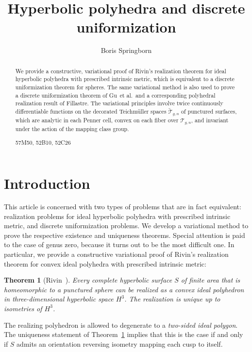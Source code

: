 \documentclass[a4paper, 11pt]{article}
\title{Hyperbolic polyhedra and discrete uniformization}
\author{Boris Springborn}
\date{}
\newcommand{\Teich}{\mathcal{T}}
\newcommand{\decTeich}{\widetilde{\Teich}}
\newcommand{\Tm}{Teich\-m{\"u}l\-ler}
\newcommand{\etal}{{et al.}}
\theoremstyle{plain}
\newtheorem{theorem}{Theorem}[section]
\theoremstyle{definition}
\begin{document}
\maketitle

\begin{abstract}
  We provide a constructive, variational proof of Rivin's realization
  theorem for ideal hyperbolic polyhedra with prescribed intrinsic
  metric, which is equivalent to a discrete uniformization theorem for
  spheres. The same variational method is also used to prove a
  discrete uniformization theorem of Gu~\etal\ and a corresponding
  polyhedral realization result of Fillastre. The variational
  principles involve twice continuously differentiable functions on
  the decorated \Tm{} spaces $\decTeich_{g,n}$ of punctured surfaces,
  which are analytic in each Penner cell, convex on each fiber over
  $\Teich_{g,n}$, and invariant under the action of the mapping class
  group.
  
  \vspace{\baselineskip}\noindent%
  57M50, 52B10, 52C26
\end{abstract}


\section{Introduction}

This article is concerned with two types of problems that are in fact
equivalent: realization problems for ideal hyperbolic polyhedra with
prescribed intrinsic metric, and discrete uniformization problems. We
develop a variational method to prove the respective existence and
uniqueness theorems. Special attention is paid to the case of genus
zero, because it turns out to be the most difficult one. 
In particular, we provide a constructive variational proof of Rivin's
realization theorem for convex ideal polyhedra with prescribed
intrinsic metric:

\begin{theorem}[Rivin~\cite{rivin94:_intrin}]
  \label{thm:rivin}
  Every complete hyperbolic surface $S$ of finite area that is
  homeomorphic to a punctured sphere can be realized as a convex ideal
  polyhedron in three-dimensional hyperbolic space $H^{3}$. The
  realization is unique up to isometries of $H^{3}$.
\end{theorem}

The realizing polyhedron is allowed to degenerate to a \emph{two-sided
  ideal polygon}. The uniqueness statement of Theorem~\ref{thm:rivin}
implies that this is the case if and only if $S$ admits an orientation
reversing isometry mapping each cusp to itself.
\end{document}
